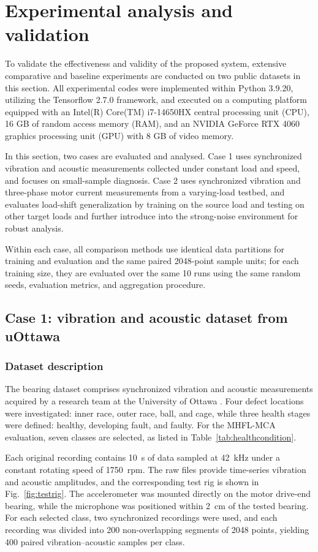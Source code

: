 \documentclass[a4paper]{cas-sc}
\begin{document}
\section{Experimental analysis and validation}
\label{experiments}

To validate the effectiveness and validity of the proposed system, extensive comparative and baseline experiments are conducted on two public datasets in this section. All experimental codes were implemented within Python 3.9.20, utilizing the Tensorflow 2.7.0 framework, and executed on a computing platform equipped with an Intel(R) Core(TM) i7-14650HX central processing unit (CPU), 16 GB of random access memory (RAM), and an NVIDIA GeForce RTX 4060 graphics processing unit (GPU) with 8 GB of video memory. 

In this section, two cases are evaluated and analysed. Case 1 uses synchronized vibration and acoustic measurements collected under constant load and speed, and focuses on small-sample diagnosis. Case 2 uses synchronized vibration and three-phase motor current measurements from a varying-load testbed, and evaluates load-shift generalization by training on the source load and testing on other target loads and further introduce into the strong-noise environment for robust analysis.

Within each case, all comparison methods use identical data
partitions for training and evaluation and the same paired
2048-point sample units; for each training size, they are evaluated over the same 10 runs using the same random seeds, evaluation metrics, and aggregation procedure.

\subsection{Case 1: vibration and acoustic dataset from uOttawa}
\subsubsection{Dataset description}

The bearing dataset comprises synchronized vibration and acoustic measurements acquired by a research team at the University of Ottawa \cite{UO}. Four defect locations were investigated: inner race, outer race, ball, and cage, while three health stages were defined: healthy, developing fault, and faulty. For the MHFL-MCA evaluation, seven classes are selected, as listed in
Table~\ref{tab:healthcondition}.

Each original recording contains 10~s of data sampled at 42~kHz under a constant rotating speed of 1750~rpm. The raw files provide time-series vibration and acoustic amplitudes, and the corresponding test rig is shown in Fig.~\ref{fig:testrig}. The accelerometer was
mounted directly on the motor drive-end bearing, while the microphone was positioned within 2~cm of the tested bearing. For each selected class, two synchronized recordings were used, and each recording was divided into 200 non-overlapping segments of 2048 points, yielding 400 paired vibration--acoustic samples per
class.
\end{document}
